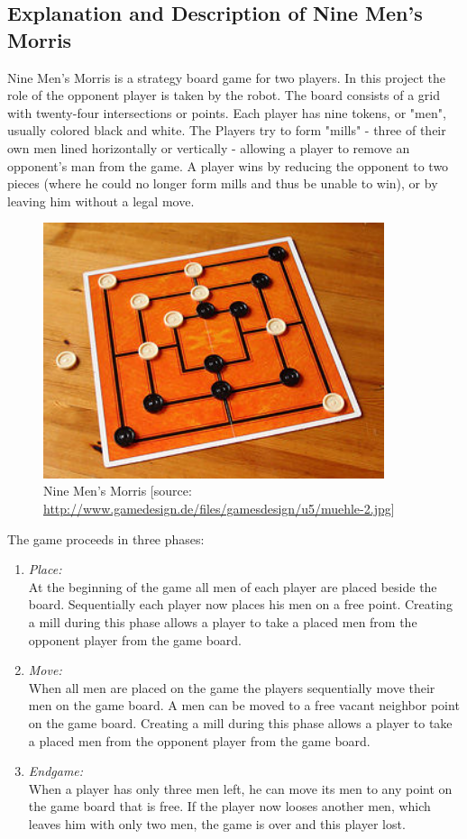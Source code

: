 \documentclass[a4paper]{spie}  %
\begin{document}
\begin{large}
\subsection{Explanation and Description of Nine Men's Morris}
Nine Men's Morris is a strategy board game for two players. In this project the role of the opponent player is taken by the robot.
The board consists of a grid with twenty-four intersections or points. Each player has nine tokens, or "men", usually colored black and white. The Players try to form "mills" - three of their own men lined horizontally or vertically - allowing a player to remove an opponent's man from the game. A player wins by reducing the opponent to two pieces (where he could no
longer form mills and thus be unable to win), or by leaving him without a legal move.
\begin{figure}[h]
\includegraphics[width=10cm]{images/mill.jpg}
\centering
\caption{Nine Men's Morris [source: \url{http://www.gamedesign.de/files/gamesdesign/u5/muehle-2.jpg}]}
\label{mill}
\end{figure}
The game proceeds in three phases:
\begin{enumerate}
\item{\emph{Place:}\\At the beginning of the game all men of each player are placed beside the board. Sequentially each player now places his men on a free point. Creating a mill during this phase allows a player to take a placed men from the opponent player from the game board.}
\item{\emph{Move:}\\When all men are placed on the game the players sequentially move their men on the game board. A men can be moved to a free vacant neighbor point on the game board. Creating a mill during this phase allows a player to take a placed men from the opponent player from the game board.}
\item{\emph{Endgame:}\\When a player has only three men left, he can move its men to any point on the game board that is free. If the player now looses another men, which leaves him with only two men, the game is over and this player lost.}
\end{enumerate}
\clearpage

\end{large}
\end{document}
